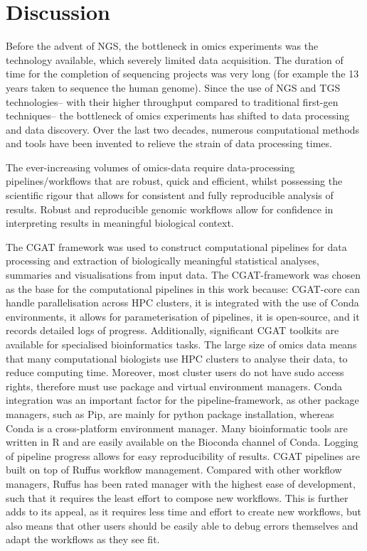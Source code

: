 



\section{Discussion}

Before the advent of NGS, the bottleneck in omics experiments was the technology available, which severely limited data acquisition.
The duration of time for the completion of sequencing projects was very long (for example the 13 years taken to sequence the human genome).
Since the use of NGS and TGS technologies-- with their higher throughput compared to traditional first-gen techniques-- the bottleneck of omics experiments has shifted to data processing and data discovery.
Over the last two decades, numerous computational methods and tools have been invented to relieve the strain of data processing times.

The ever-increasing volumes of omics-data require data-processing pipelines/workflows that are robust, quick and efficient, whilst possessing the scientific rigour that allows for consistent and fully reproducible analysis of results.
Robust and reproducible genomic workflows allow for confidence in interpreting results in meaningful biological context.

The CGAT framework was used to construct computational pipelines for data processing and extraction of biologically meaningful statistical analyses, summaries and visualisations from input data.
The CGAT-framework was chosen as the base for the computational pipelines in this work because: CGAT-core can handle parallelisation across HPC clusters, it is integrated with the use of Conda environments, it allows for parameterisation of pipelines, it is open-source, and it records detailed logs of progress. Additionally, significant CGAT toolkits are available for specialised bioinformatics tasks.
The large size of omics data means that many computational biologists use HPC clusters to analyse their data, to reduce computing time. Moreover, most cluster users do not have sudo access rights, therefore must use package and virtual environment managers.
Conda integration was an important factor for the pipeline-framework, as other package managers, such as Pip, are mainly for python package installation, whereas Conda is a cross-platform environment manager.
Many bioinformatic tools are written in R and are easily available on the Bioconda channel of Conda.
Logging of pipeline progress allows for easy reproducibility of results.
CGAT pipelines are built on top of Ruffus workflow management.
Compared with other workflow managers, Ruffus has been rated manager with the highest ease of development, such that it requires the least effort to compose new workflows\cite{leipzig2017review}.
This is further adds to its appeal, as it requires less time and effort to create new workflows, but also means that other users should be easily able to debug errors themselves and adapt the workflows as they see fit.

